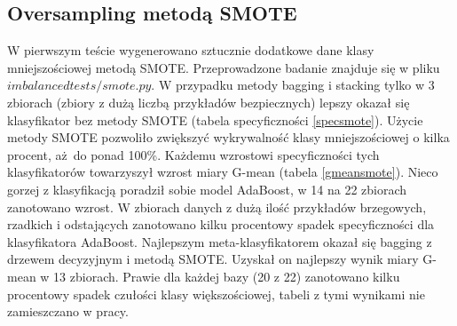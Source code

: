 \subsection{Oversampling metodą SMOTE}
W pierwszym teście wygenerowano sztucznie dodatkowe dane klasy mniejszościowej metodą SMOTE. Przeprowadzone badanie znajduje się w pliku $imbalancedtests/smote.py$. W przypadku metody bagging i stacking tylko w 3 zbiorach (zbiory z dużą liczbą przykładów bezpiecznych) lepszy okazał się klasyfikator bez metody SMOTE (tabela specyficzności \ref{specsmote}). Użycie metody SMOTE pozwoliło zwiększyć wykrywalność klasy mniejszościowej o kilka procent, aż do ponad 100\%. Każdemu wzrostowi specyficzności tych klasyfikatorów towarzyszył wzrost miary G-mean (tabela \ref{gmeansmote}). Nieco gorzej z klasyfikacją poradził sobie model AdaBoost, w 14 na 22 zbiorach zanotowano wzrost. W zbiorach danych z dużą ilość przykładów brzegowych, rzadkich i odstających zanotowano kilku procentowy spadek specyficzności dla klasyfikatora AdaBoost. Najlepszym meta-klasyfikatorem okazał się bagging z drzewem decyzyjnym i metodą SMOTE. Uzyskał on najlepszy wynik miary G-mean w 13 zbiorach. Prawie dla każdej bazy (20 z 22) zanotowano kilku procentowy spadek czułości klasy większościowej, tabeli z tymi wynikami nie zamieszczano w pracy.
